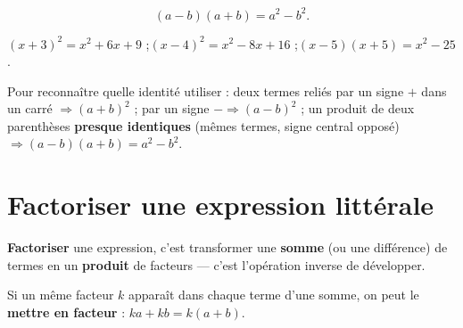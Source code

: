 \begin{propriete}
\[
(a-b)(a+b)=a^{2}-b^{2}.
\]
\end{propriete}

\begin{illus}
\end{illus}

\begin{exemple}
$(x+3)^{2}=x^{2}+6x+9$ ;\quad $(x-4)^{2}=x^{2}-8x+16$ ;\quad $(x-5)(x+5)=x^{2}-25$.
\end{exemple}

\begin{aretenir}
Pour reconnaître quelle identité utiliser : deux termes reliés par un signe $+$ dans un
carré $\Rightarrow(a+b)^{2}$ ; par un signe $-\Rightarrow(a-b)^{2}$ ; un produit de deux
parenthèses \textbf{presque identiques} (mêmes termes, signe central opposé)
$\Rightarrow(a-b)(a+b)=a^{2}-b^{2}$.
\end{aretenir}

\section{Factoriser une expression littérale}

\begin{definition}[Factoriser]
\textbf{Factoriser} une expression, c'est transformer une \textbf{somme} (ou une différence)
de termes en un \textbf{produit} de facteurs — c'est l'opération inverse de développer.
\end{definition}

\begin{propriete}
Si un même facteur $k$ apparaît dans chaque terme d'une somme, on peut le \textbf{mettre en
facteur} : $ka+kb=k(a+b)$.
\end{propriete}

